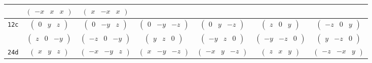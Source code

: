 \documentclass[fleqn,9pt,landscape]{jsarticle}
\begin{document}
\begin{center}
\begin{longtable}{ccccccc}
& $ \begin{pmatrix} - x & x & x \end{pmatrix} $ & $ \begin{pmatrix} x & - x & x \end{pmatrix} $ & $  $ & $  $ & $  $ & $  $ \\ \hline
{\tt 12c} & $ \begin{pmatrix} 0 & y & z \end{pmatrix} $ & $ \begin{pmatrix} 0 & - y & z \end{pmatrix} $ & $ \begin{pmatrix} 0 & - y & - z \end{pmatrix} $ & $ \begin{pmatrix} 0 & y & - z \end{pmatrix} $ & $ \begin{pmatrix} z & 0 & y \end{pmatrix} $ & $ \begin{pmatrix} - z & 0 & y \end{pmatrix} $ \\
& $ \begin{pmatrix} z & 0 & - y \end{pmatrix} $ & $ \begin{pmatrix} - z & 0 & - y \end{pmatrix} $ & $ \begin{pmatrix} y & z & 0 \end{pmatrix} $ & $ \begin{pmatrix} - y & z & 0 \end{pmatrix} $ & $ \begin{pmatrix} - y & - z & 0 \end{pmatrix} $ & $ \begin{pmatrix} y & - z & 0 \end{pmatrix} $ \\ \hline
{\tt 24d} & $ \begin{pmatrix} x & y & z \end{pmatrix} $ & $ \begin{pmatrix} - x & - y & z \end{pmatrix} $ & $ \begin{pmatrix} x & - y & - z \end{pmatrix} $ & $ \begin{pmatrix} - x & y & - z \end{pmatrix} $ & $ \begin{pmatrix} z & x & y \end{pmatrix} $ & $ \begin{pmatrix} - z & - x & y \end{pmatrix} $ \\

\end{longtable}
\end{center}
\end{document}
